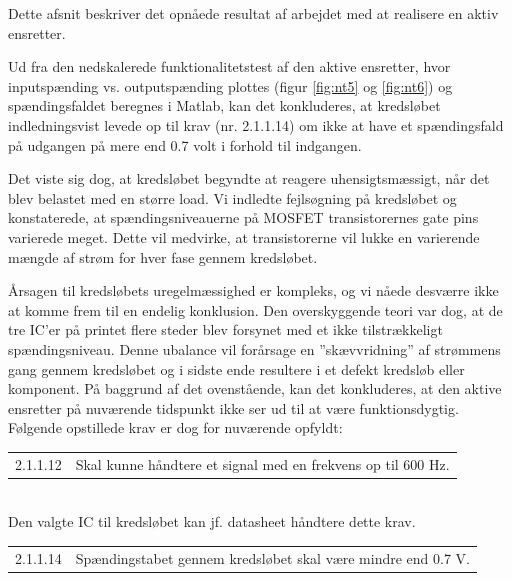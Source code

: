 Dette afsnit beskriver det opnåede resultat af arbejdet med at realisere en aktiv ensretter. 

Ud fra den nedskalerede funktionalitetstest af den aktive ensretter, hvor inputspænding vs. outputspænding plottes (figur \ref{fig:nt5} og \ref{fig:nt6}) og spændingsfaldet beregnes i Matlab, kan det konkluderes, at kredsløbet indledningsvist levede op til krav (nr. 2.1.1.14) om ikke at have et spændingsfald på udgangen på mere end 0.7 volt i forhold til indgangen.  

Det viste sig dog, at kredsløbet begyndte at reagere uhensigtsmæssigt, når det blev belastet med en større load. Vi indledte fejlsøgning på kredsløbet og konstaterede, at spændingsniveauerne på MOSFET transistorernes gate pins varierede meget. Dette vil medvirke, at transistorerne vil lukke en varierende mængde af strøm for hver fase gennem kredsløbet. 

Årsagen til kredsløbets uregelmæssighed er kompleks, og vi nåede desværre ikke at komme frem til en endelig konklusion. Den overskyggende teori var dog, at de tre IC’er på printet flere steder blev forsynet med et ikke tilstrækkeligt spændingsniveau. Denne ubalance vil forårsage en ”skævvridning” af strømmens gang gennem kredsløbet og i sidste ende resultere i et defekt kredsløb eller komponent.  
På baggrund af det ovenstående, kan det konkluderes, at den aktive ensretter på nuværende tidspunkt ikke ser ud til at være funktionsdygtig. Følgende opstillede krav er dog for nuværende opfyldt:\\

\vspace{1em}
\begin{tabular}[h]{ll}
2.1.1.12&Skal kunne håndtere et signal med en frekvens op til 600 Hz.\vspace{0.5em}\\
\end{tabular}
\vspace{1em}\\


Den valgte IC til kredsløbet kan jf. datasheet håndtere dette krav.\\

\vspace{1em}
\begin{tabular}[h]{ll}
2.1.1.14&Spændingstabet gennem kredsløbet skal være mindre end 0.7 V.\vspace{0.5em}\\
\end{tabular}
\vspace{1em}\\


